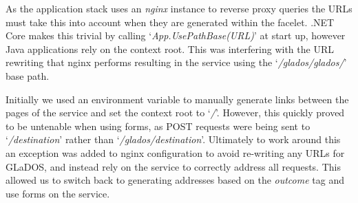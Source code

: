 \par
As the application stack uses an \textit{nginx} instance to reverse proxy queries the URLs must take this into account when they are generated within the facelet. .NET Core makes this trivial by calling `\textit{App.UsePathBase(URL)}' at start up, however Java applications rely on the context root. This was interfering with the URL rewriting that nginx performs resulting in the service using the 
`\textit{/glados/glados/}' base path.

\par
Initially we used an environment variable to manually generate links between the pages of the service and set the context root to 
`\textit{/}'. However, this quickly proved to be untenable when using forms, as POST requests were being sent to 
`\textit{/destination}' 
rather than 
`\textit{/glados/destination}'. Ultimately to work around this an exception was added to nginx configuration to avoid re-writing any URLs for GLaDOS, and instead rely on the service to correctly address all requests. This allowed us to switch back to generating addresses based on the \textit{outcome} tag and use forms on the service.